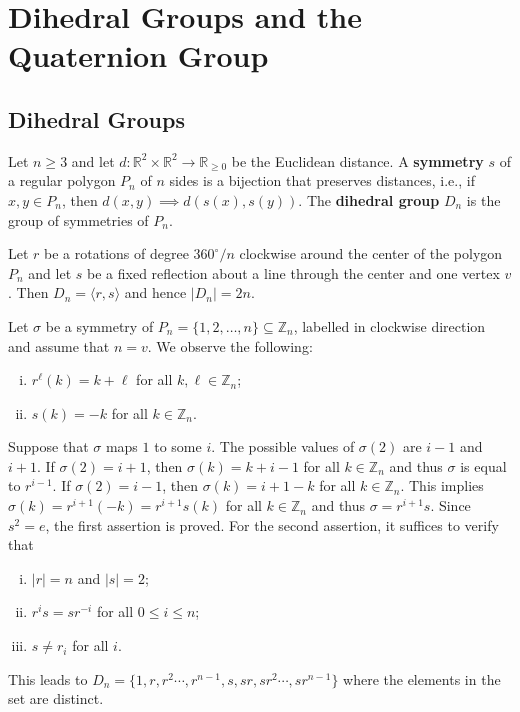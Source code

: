 \newpage
\section{Dihedral Groups and the Quaternion Group}
\subsection{Dihedral Groups}
\begin{definition}
	  Let $n\geq 3$ and let $d:\mathbb{R}^2\times \mathbb{R}^2\rightarrow \mathbb{R}_{\geq 0}$ be the Euclidean distance. A \textbf{symmetry} $s$ of a regular polygon $P_n$ of $n$ sides  is a bijection that preserves distances, i.e., if $x,y\in P_n$, then $d(x,y)\implies d(s(x),s(y))$.    The \textbf{dihedral group} $D_{n}$ is  the group of
	symmetries of  $P_n$.
\end{definition}
\begin{proposition}
	Let $r$ be a rotations of degree $360^\circ/n$ clockwise around the center of the polygon $P_n$ and let $s$ be a fixed reflection about a line through the center and one vertex $v$. Then $D_{n} = \langle r,s\rangle$ and hence $|D_{n}|  = 2n$.
\end{proposition}
\begin{sketch}
	Let $\sigma$ be a symmetry of $P_n = \{1,2,\dots, n\}\subseteq \mathbb{Z}_n$, labelled in clockwise direction and assume that $n = v$. We observe the following:
	\begin{enumerate}[(i)]
		\item $r^{\ell}(k) = k+\ell$ for all $k,\ell\in \mathbb{Z}_n$;
		\item $s(k) = -k$ for all $k\in \mathbb{Z}_n$. 
	\end{enumerate} Suppose that $\sigma$ maps $1$ to some $i$. The possible values of $\sigma(2)$ are $i-1$ and $i+1$. If $\sigma(2) = i+1$, then $\sigma(k) = k+i-1$ for all $k\in\mathbb{Z}_n$ and thus $\sigma$ is equal to  $r^{i-1}$.   If $\sigma(2) = i-1$, then $\sigma(k) = i+1-k$  for all $k\in\mathbb{Z}_n$. This implies $\sigma(k) = r^{i+1}(-k) = r^{i+1}s(k)$ for all $k\in \mathbb{Z}_n$ and thus $\sigma = r^{i+1}s$. Since $s^2=e$, the first assertion is proved. For the second assertion, it suffices to verify that
	\begin{enumerate}[(i)]
		\item $|r| = n$ and $|s| = 2$;
		\item $r^is = sr^{-i}$ for all $0 \leq i \leq n$;
		\item $s\neq r_i$ for all $i$.
	\end{enumerate}
	This leads to $D_{n}= \{1,r,r^2\cdots, r^{n-1},s,sr,sr^2\cdots, sr^{n-1}\}$ where the elements in the set are distinct.
\end{sketch}
